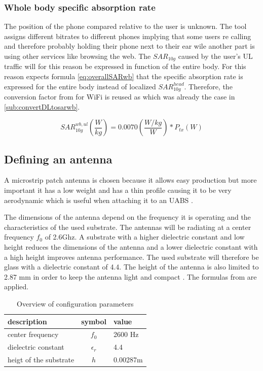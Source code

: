 \subsubsection{Whole body specific absorption rate}
The position of the phone compared relative to the user is unknown. The tool assigns different bitrates to different phones implying 
that some users re calling and therefore probably holding their phone next to their ear wile another part is using other services like browsing the web.
The $SAR_{10g}$ caused by the user's \gls{UL} traffic will for this reason be expressed in function of the entire body.
For this reason expects formula \ref{eq:overallSARwb} that the specific absorption rate is expressed for the entire body instead of localized $SAR^{head}_{10g}$.
Therefore, the conversion factor from \cite{J22_plets2015joint} for WiFi is reused as which was already the case in \ref{sub:convertDLtosarwb}.

\begin{equation} 
SAR^{wb,ul}_{10g} \left(\frac{W}{kg}\right) = 0.0070 \left(\frac{W/kg}{W}\right) * P_{tx} (W)
\label{eq:solve}
\end{equation}

\subsection{Defining an antenna}
\label{sub:definingAntenna}
A microstrip patch antenna is chosen because it allows easy production but more important it has a low weight and has a thin profile causing it to be very aerodynamic which is useful when attaching it to an \gls{UABS} \cite{J13_microstripadvantages}.

The dimensions of the antenna depend on the frequency it is operating and the characteristics of the used substrate.
The antennas will be radiating at a center frequency $f_0$ of 2.6Ghz. A substrate with a higher dielectric constant and low height reduces the dimensions of the antenna
and a lower dielectric constant with a high height improves antenna performance. The used substrate will therefore be glass with a dielectric constant of 4.4. The height of the antenna is also limited to 2.87 mm in order to keep the antenna light and compact \cite{J14_antennadesign}.
The formulas from \cite{J14_antennadesign} are \cite{J15_antennadesign} applied. 

\begin{table}[h!]
\centering
\begin{tabular}{|l|c|l|}
\hline
 description            & symbol          & value         \\    \hline
 center frequency       & $f_0$           & 2600 Hz       \\ 
 dielectric constant    & $\epsilon_r$    & 4.4         \\ 
 heigt of the substrate & $h$             & 0.00287m    \\ \hline
\end{tabular}
\caption{Overview of configuration parameters}
\end{table}

